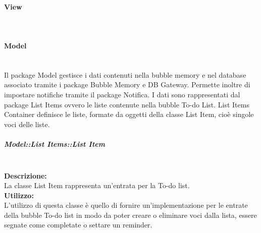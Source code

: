 
\begin{samepage}
\paragraph{View}\mbox{}\\
\end{samepage}

\paragraph{Model}\mbox{}\\
Il package Model gestisce i dati contenuti nella bubble memory e nel database associato tramite i package Bubble Memory e DB Gateway. Permette inoltre di impostare notifiche tramite il package Notifica. I dati sono rappresentati dal package List Items ovvero le liste contenute nella bubble To-do List. List Items Container definisce le liste, formate da oggetti della classe List Item, cioè singole voci delle liste. 


\subparagraph{Model::List Items::List Item}\label{todo-item}\mbox{}\\
\textbf{Descrizione:}\\
La classe List Item rappresenta un'entrata per la To-do list.\\
\textbf{Utilizzo:}\\
L'utilizzo di questa classe è quello di fornire un'implementazione per le entrate della bubble To-do list in modo da poter creare o eliminare voci dalla lista, essere segnate come completate o settare un reminder.\\

